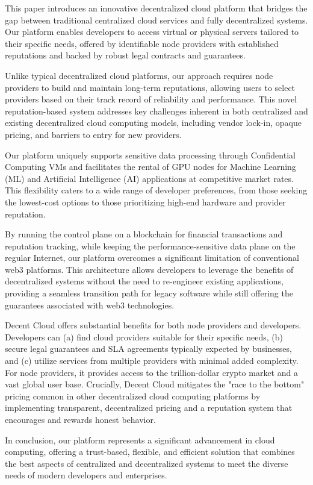 This paper introduces an innovative decentralized cloud platform that bridges the gap between traditional centralized cloud services and fully decentralized systems. Our platform enables developers to access virtual or physical servers tailored to their specific needs, offered by identifiable node providers with established reputations and backed by robust legal contracts and guarantees.

Unlike typical decentralized cloud platforms, our approach requires node providers to build and maintain long-term reputations, allowing users to select providers based on their track record of reliability and performance. This novel reputation-based system addresses key challenges inherent in both centralized and existing decentralized cloud computing models, including vendor lock-in, opaque pricing, and barriers to entry for new providers.

Our platform uniquely supports sensitive data processing through Confidential Computing VMs and facilitates the rental of GPU nodes for Machine Learning (ML) and Artificial Intelligence (AI) applications at competitive market rates. This flexibility caters to a wide range of developer preferences, from those seeking the lowest-cost options to those prioritizing high-end hardware and provider reputation.

By running the control plane on a blockchain for financial transactions and reputation tracking, while keeping the performance-sensitive data plane on the regular Internet, our platform overcomes a significant limitation of conventional web3 platforms. This architecture allows developers to leverage the benefits of decentralized systems without the need to re-engineer existing applications, providing a seamless transition path for legacy software while still offering the guarantees associated with web3 technologies.

Decent Cloud offers substantial benefits for both node providers and developers. Developers can (a) find cloud providers suitable for their specific needs, (b) secure legal guarantees and SLA agreements typically expected by businesses, and (c) utilize services from multiple providers with minimal added complexity. For node providers, it provides access to the trillion-dollar crypto market and a vast global user base. Crucially, Decent Cloud mitigates the "race to the bottom" pricing common in other decentralized cloud computing platforms by implementing transparent, decentralized pricing and a reputation system that encourages and rewards honest behavior.

In conclusion, our platform represents a significant advancement in cloud computing, offering a trust-based, flexible, and efficient solution that combines the best aspects of centralized and decentralized systems to meet the diverse needs of modern developers and enterprises.
